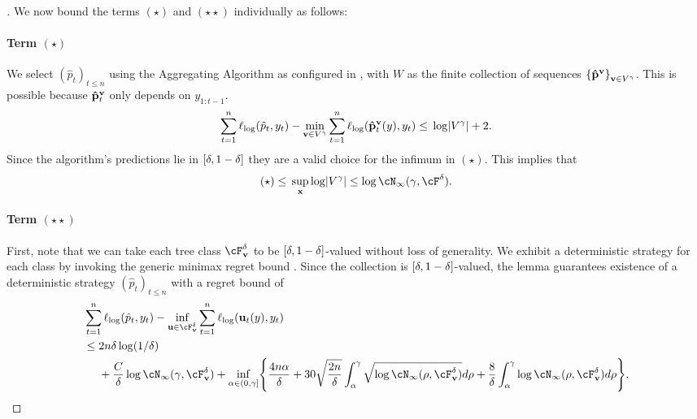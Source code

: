 \begin{proof}[]
We now bound the terms $(\star)$ and $(\star\star)$ individually as follows:

\paragraph{Term $(\star)$}
We select $(\hat{p}_t)_{t\leq{}n}$ using the Aggregating Algorithm as configured in , with $W$ as the finite collection of sequences $\crl*{\phtree^{\vv}}_{\vv\in{}V^{\gamma}}$. This is possible because $\phtree^{\vv}_{t}$ only depends on $y_{1:t-1}$.
\[
\sum_{t=1}^n \logloss(\hat{p}_t,y_t) - \min_{\vv \in V^\gamma}\sum_{t=1}^n \logloss(\phtree_t^\vv(y),y_t) \leq{} \log\abs*{V^{\gamma}} + 2.
\]
Since the algorithm's predictions lie in $\deltarange$ they are a valid choice for the infimum in $(\star)$. This implies that
\[
(\star) \leq{} \sup_{\x}\log\abs*{V^{\gamma}}\leq \log\cN_{\infty}(\gamma, \cF^{\delta}).
\]

\paragraph{Term $(\star\star)$}

First, note that we can take each tree class $\cF_{\vv}^{\delta}$ to be $\deltarange$-valued without loss of generality. We exhibit a deterministic strategy for each class by invoking the generic minimax regret bound . Since the collection is $\deltarange$-valued, the lemma guarantees existence of a deterministic strategy $(\hat{p}_t)_{t\leq{}n}$ with a regret bound of
{\small
  \begin{align*}
    &\sum_{t=1}^{n}\logloss(\hat{p}_t, y_t) - \inf_{\uu\in{}\cF_{\vv}^{\delta}}\sum_{t=1}^{n}\logloss(\uu_{t}(y), y_t) \\
    &\leq{}
    2n\delta\log(1/\delta) \\
    &~~~~+ \frac{C}{\delta}\log\cN_{\infty}(\gamma, \cF_{\vv}^{\delta}) + \inf_{\alpha\in(0, \gamma]}\crl*{
      \frac{4n\alpha}{\delta} + 30\sqrt{\frac{2n}{\delta}}\int_{\alpha}^{\gamma}\sqrt{\log\cN_{\infty}(\rho,\cF_{\vv}^{\delta})}d\rho
      + \frac{8}{\delta}\int_{\alpha}^{\gamma}\log\cN_{\infty}(\rho,\cF_{\vv}^{\delta})d\rho
      }.
  \end{align*}}


\end{proof}
